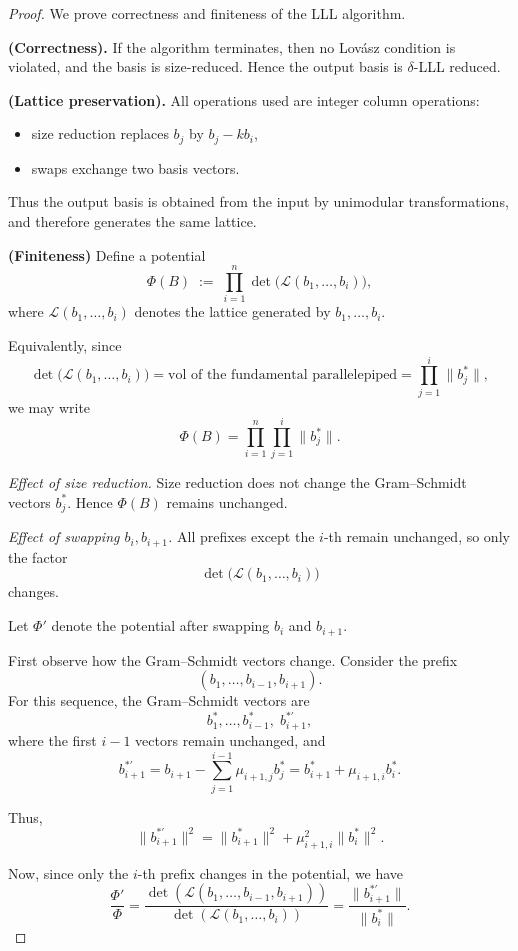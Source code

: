 \documentclass[11pt]{article}
\theoremstyle{plain}
\theoremstyle{definition}
\begin{document}
\begin{proof}
We prove correctness and finiteness of the LLL algorithm.

\medskip
\noindent\textbf{(Correctness).}
If the algorithm terminates, then no Lovász condition is violated, and the
basis is size-reduced. Hence the output basis is $\delta$-LLL reduced.

\medskip
\noindent\textbf{(Lattice preservation).}
All operations used are integer column operations:
\begin{itemize}
  \item size reduction replaces $b_j$ by $b_j - k b_i$,
  \item swaps exchange two basis vectors.
\end{itemize}
Thus the output basis is obtained from the input by unimodular transformations,
and therefore generates the same lattice.

\medskip
  \noindent\textbf{(Finiteness)}
Define a potential
\[
  \Phi(B)
  \;:=\;
  \prod_{i=1}^n \det\!\big(\mathcal{L}(b_1,\dots,b_i)\big),
\]
where $\mathcal{L}(b_1,\dots,b_i)$ denotes the lattice generated by
$b_1,\dots,b_i$.

Equivalently, since
\[
  \det\!\big(\mathcal{L}(b_1,\dots,b_i)\big)
  = \text{vol of the fundamental parallelepiped}
  = \prod_{j=1}^i \|b_j^*\|,
\]
we may write
\[
  \Phi(B)
  =
  \prod_{i=1}^n \prod_{j=1}^i \|b_j^*\|.
\]

\medskip
\noindent\emph{Effect of size reduction.}
Size reduction does not change the Gram--Schmidt vectors $b_j^*$.
Hence $\Phi(B)$ remains unchanged.

\medskip
\noindent\emph{Effect of swapping $b_i, b_{i+1}$.}
All prefixes except the $i$-th remain unchanged, so only the factor
\[
  \det\!\big(\mathcal{L}(b_1,\dots,b_i)\big)
\]
changes.

Let $\Phi'$ denote the potential after swapping $b_i$ and $b_{i+1}$.

First observe how the Gram--Schmidt vectors change. Consider the prefix
\[
  (b_1, \dots, b_{i-1}, b_{i+1}).
\]
For this sequence, the Gram--Schmidt vectors are
\[
  b_1^*, \dots, b_{i-1}^*, \; b_{i+1}^{*\prime},
\]
where the first $i-1$ vectors remain unchanged, and
\[
  b_{i+1}^{*\prime}
  =
  b_{i+1} - \sum_{j=1}^{i-1} \mu_{i+1,j} b_j^*
  =
  b_{i+1}^* + \mu_{i+1,i} b_i^*.
\]

Thus,
\[
  \|b_{i+1}^{*\prime}\|^2
  =
  \|b_{i+1}^*\|^2 + \mu_{i+1,i}^2 \|b_i^*\|^2.
\]

Now, since only the $i$-th prefix changes in the potential, we have
\[
  \frac{\Phi'}{\Phi}
  =
  \frac{\det(\mathcal{L}(b_1,\dots,b_{i-1},b_{i+1}))}
       {\det(\mathcal{L}(b_1,\dots,b_i))}
  =
  \frac{\|b_{i+1}^{*\prime}\|}{\|b_i^*\|}.
\]


\end{proof}
\end{document}
